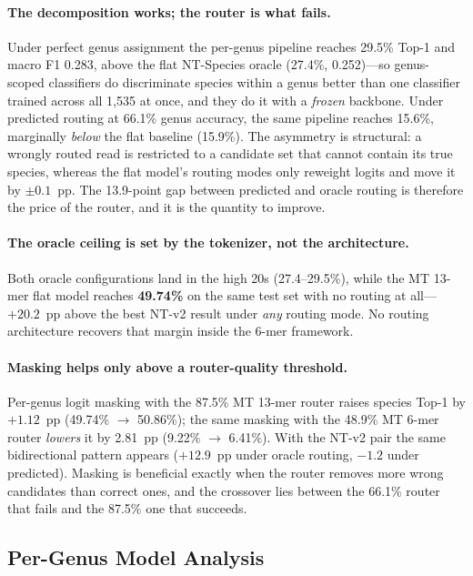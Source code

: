 \paragraph{The decomposition works; the router is what fails.}
Under perfect genus assignment the per-genus pipeline reaches 29.5\% Top-1 and macro
F1 0.283, above the flat NT-Species oracle (27.4\%, 0.252)---so genus-scoped
classifiers do discriminate species within a genus better than one classifier trained
across all 1{,}535 at once, and they do it with a \emph{frozen} backbone. Under
predicted routing at 66.1\% genus accuracy, the same pipeline reaches 15.6\%,
marginally \emph{below} the flat baseline (15.9\%). The asymmetry is structural: a
wrongly routed read is restricted to a candidate set that cannot contain its true
species, whereas the flat model's routing modes only reweight logits and move it by
$\pm0.1$~pp. The 13.9-point gap between predicted and oracle routing is therefore the
price of the router, and it is the quantity to improve.

\paragraph{The oracle ceiling is set by the tokenizer, not the architecture.}
Both oracle configurations land in the high 20s (27.4--29.5\%), while the MT 13-mer
flat model reaches \textbf{49.74\%} on the same test set with no routing at all---
$+20.2$~pp above the best NT-v2 result under \emph{any} routing mode. No routing
architecture recovers that margin inside the 6-mer framework.

\paragraph{Masking helps only above a router-quality threshold.}
Per-genus logit masking with the 87.5\% MT 13-mer router raises species Top-1 by
$+1.12$~pp (49.74\% $\to$ 50.86\%); the same masking with the 48.9\% MT 6-mer router
\emph{lowers} it by 2.81~pp (9.22\% $\to$ 6.41\%). With the NT-v2 pair the same
bidirectional pattern appears ($+12.9$~pp under oracle routing, $-1.2$ under
predicted). Masking is beneficial exactly when the router removes more wrong
candidates than correct ones, and the crossover lies between the 66.1\% router that
fails and the 87.5\% one that succeeds.

\subsection{Per-Genus Model Analysis}
\label{sec:spv4-per-genus}

